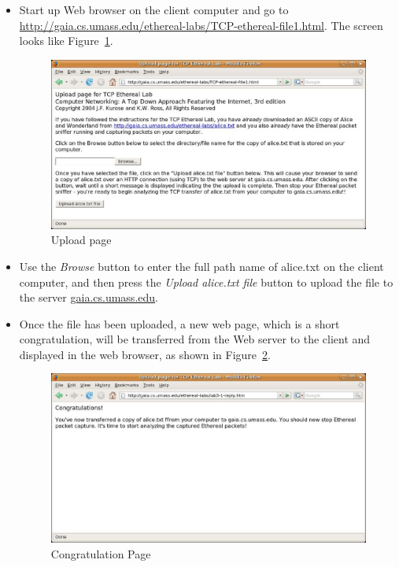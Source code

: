 \begin{itemize}
\item Start up Web browser on the client computer and go to
  \url{http://gaia.cs.umass.edu/ethereal-labs/TCP-ethereal-file1.html}.
  The screen looks like Figure~\ref{lab_4_fig_1}.
\begin{figure}[ht]
    \centering
    \includegraphics[width=0.99\columnwidth]{figs/lab_4_fig_1.eps}
    \caption{Upload page}\label{lab_4_fig_1}
\end{figure}
\item Use the {\em Browse} button to enter the full
  path name of alice.txt on the client computer, and then press the
  {\em Upload alice.txt file} button to upload the file to the server
 \url{gaia.cs.umass.edu}.
\item Once the file has been uploaded, a new web page, which is a
  short congratulation, will be transferred from the Web server to the
  client and displayed in the web browser, as shown in Figure~\ref{lab_4_fig_2}.
\begin{figure}[ht]
    \centering
    \includegraphics[width=0.99\columnwidth]{figs/lab_4_fig_2.eps}
    \caption{Congratulation Page}\label{lab_4_fig_2}
\end{figure}
\end{itemize}

